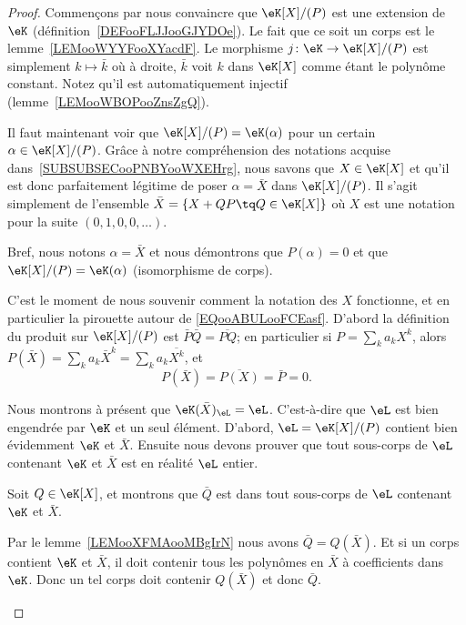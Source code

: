 \begin{proof}
	Commençons par nous convaincre que \( \eK[X]/(P)\) est une extension de \( \eK\) (définition~\ref{DEFooFLJJooGJYDOe}). Le fait que ce soit un corps est le lemme~\ref{LEMooWYYFooXYacdF}. Le morphisme \( j\colon \eK\to \eK[X]/(P)\) est simplement \( k\mapsto \bar k\) où à droite, \( \bar k\) voit \( k\) dans \( \eK[X]\) comme étant le polynôme constant. Notez qu'il est automatiquement injectif (lemme~\ref{LEMooWBOPooZnsZgQ}).

	Il faut maintenant voir que \( \eK[X]/(P)=\eK(\alpha)\) pour un certain \( \alpha\in \eK[X]/(P)\). Grâce à notre compréhension des notations acquise dans~\ref{SUBSUBSECooPNBYooWXEHrg}, nous savons que \( X\in\eK[X]\) et qu'il est donc parfaitement légitime de poser \( \alpha=\bar X\) dans \( \eK[X]/(P)\). Il s'agit simplement de l'ensemble \( \bar X=\{ X+QP\tq Q\in \eK[X] \}\) où \( X\) est une notation pour la suite \( (0,1,0,0,\ldots)\).

	Bref, nous notons \( \alpha=\bar X\) et nous démontrons que \( P(\alpha)=0\) et que \( \eK[X]/(P)=\eK(\alpha)\) (isomorphisme de corps).
	\begin{subproof}
		\spitem[\( P(\bar X)=0\)]

		C'est le moment de nous souvenir comment la notation des \( X\) fonctionne, et en particulier la pirouette autour de \eqref{EQooABULooFCEasf}. D'abord la définition du produit sur \( \eK[X]/(P)\) est \( \bar P\bar Q=\overline{ PQ }\); en particulier si \( P=\sum_ka_kX^k\), alors \( P(\bar X)=\sum_ka_k\bar X^k=\sum_ka_k\overline{ X^k }\), et
		\begin{equation}
			P(\bar X)=\overline{ P(X) }=\bar P=0.
		\end{equation}
		\spitem[L'égalité]

		Nous montrons à présent que \( \eK(\bar X)_{\eL}=\eL\). C'est-à-dire que \( \eL\) est bien engendrée par \( \eK\) et un seul élément. D'abord, \( \eL=\eK[X]/(P)\) contient bien évidemment \( \eK\) et \( \bar X\). Ensuite nous devons prouver que tout sous-corps de \( \eL\) contenant \( \eK\) et \( \bar X\) est en réalité \( \eL\) entier.

		Soit \( Q\in \eK[X]\), et montrons que \( \bar Q\) est dans tout sous-corps de \( \eL\) contenant \( \eK\) et \( \bar X\).

		Par le lemme~\ref{LEMooXFMAooMBgIrN} nous avons \( \bar Q=Q(\bar X)\). Et si un corps contient \( \eK\) et \( \bar X\), il doit contenir tous les polynômes en \( \bar X\) à coefficients dans \( \eK\). Donc un tel corps doit contenir \( Q(\bar X)\) et donc \( \bar Q\).

	\end{subproof}
\end{proof}

